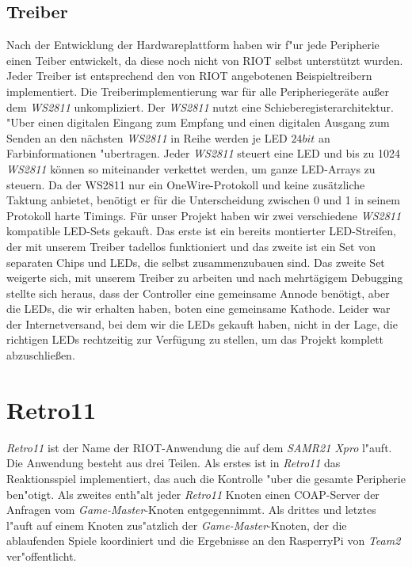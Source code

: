 \documentclass[a4paper]{article}
\begin{document}
  \subsection{Treiber}
    \label{sec:hardware_driver}
    Nach der Entwicklung der Hardwareplattform haben wir f"ur jede Peripherie
    einen Teiber entwickelt, da diese noch nicht von RIOT selbst unterstützt
    wurden. Jeder Treiber ist entsprechend den von RIOT angebotenen
    Beispieltreibern implementiert. Die Treiberimplementierung war für alle
    Peripheriegeräte außer dem \textit{WS2811} unkompliziert. Der
    \textit{WS2811} nutzt eine Schieberegisterarchitektur.  "Uber einen
    digitalen Eingang zum Empfang und einen digitalen Ausgang zum Senden an den
    nächsten \textit{WS2811} in Reihe werden je LED \( 24 bit\) an
    Farbinformationen "ubertragen.  Jeder \textit{WS2811} steuert eine LED und
    bis zu 1024 \textit{WS2811} können so miteinander verkettet werden, um ganze
    LED-Arrays zu steuern. Da der WS2811 nur ein OneWire-Protokoll und keine
    zusätzliche Taktung anbietet, benötigt er für die Unterscheidung zwischen 0
    und 1 in seinem Protokoll harte Timings. Für unser Projekt haben wir zwei
    verschiedene \textit{WS2811} kompatible LED-Sets gekauft. Das erste ist ein
    bereits montierter LED-Streifen, der mit unserem Treiber tadellos
    funktioniert und das zweite ist ein Set von separaten Chips und LEDs, die
    selbst zusammenzubauen sind. Das zweite Set weigerte sich, mit unserem
    Treiber zu arbeiten und nach mehrtägigem Debugging stellte sich heraus,
    dass der Controller eine gemeinsame Annode benötigt, aber die LEDs, die wir
    erhalten haben, boten eine gemeinsame Kathode.  Leider war der
    Internetversand, bei dem wir die LEDs gekauft haben, nicht in der Lage, die
    richtigen LEDs rechtzeitig zur Verfügung zu stellen, um das Projekt
    komplett abzuschließen.

\section{Retro11}
  \label{sec:retro11}
  \textit{Retro11} ist der Name der RIOT-Anwendung die auf dem \textit{SAMR21
  Xpro} l"auft. Die Anwendung besteht aus drei Teilen. Als erstes ist in
  \textit{Retro11} das Reaktionsspiel implementiert, das auch die Kontrolle
  "uber die gesamte Peripherie ben"otigt. Als zweites enth"alt jeder
  \textit{Retro11} Knoten einen COAP-Server der Anfragen vom
  \textit{Game-Master}-Knoten entgegennimmt. Als drittes und letztes l"auft auf
  einem Knoten zus"atzlich der \textit{Game-Master}-Knoten, der die ablaufenden
  Spiele koordiniert und die Ergebnisse an den RasperryPi von \textit{Team2}
  ver"offentlicht.
\end{document}
